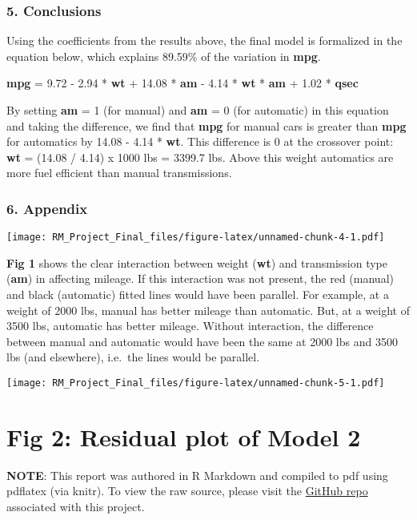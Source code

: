 \documentclass[10pt,]{article}
\begin{document}
\subsubsection{5. Conclusions}\label{conclusions}

Using the coefficients from the results above, the final model is
formalized in the equation below, which explains 89.59\% of the
variation in \textbf{mpg}.

\textbf{mpg} = 9.72 - 2.94 * \textbf{wt} + 14.08 * \textbf{am} - 4.14 *
\textbf{wt} * \textbf{am} + 1.02 * \textbf{qsec}

By setting \textbf{am} = 1 (for manual) and \textbf{am} = 0 (for
automatic) in this equation and taking the difference, we find that
\textbf{mpg} for manual cars is greater than \textbf{mpg} for automatics
by 14.08 - 4.14 * \textbf{wt}. This difference is 0 at the crossover
point: \textbf{wt} = (14.08 / 4.14) x 1000 lbs = 3399.7 lbs. Above this
weight automatics are more fuel efficient than manual transmissions.

\newpage

\subsubsection{6. Appendix}\label{appendix}

\texttt{[image: RM\_Project\_Final\_files/figure-latex/unnamed-chunk-4-1.pdf]}

\textbf{Fig 1} shows the clear interaction between weight (\textbf{wt})
and transmission type (\textbf{am}) in affecting mileage. If this
interaction was not present, the red (manual) and black (automatic)
fitted lines would have been parallel. For example, at a weight of 2000
lbs, manual has better mileage than automatic. But, at a weight of 3500
lbs, automatic has better mileage. Without interaction, the difference
between manual and automatic would have been the same at 2000 lbs and
3500 lbs (and elsewhere), i.e.~the lines would be parallel.

\texttt{[image: RM\_Project\_Final\_files/figure-latex/unnamed-chunk-5-1.pdf]}

\section{Fig 2: Residual plot of Model
2}\label{fig-2-residual-plot-of-model-2}

\textbf{NOTE}: This report was authored in R Markdown and compiled to
pdf using pdflatex (via knitr). To view the raw source, please visit the
\href{https://github.com/rswamidasan/Regression-Models}{GitHub repo}
associated with this project.
\end{document}
